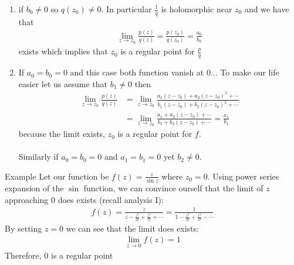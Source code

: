 \begin{enumerate}
    \item if $b_0 \neq 0$ so $q\left(z_0\right) \neq 0$. In particular $\frac{1}{q}$ is holomorphic near $z_0$ and we have that
		\begin{align*} \lim_{z  \to z_0} \frac{p\left(z\right)}{q\left(z\right)} = \frac{p\left(z_0\right)}{q\left(z_0\right)}= \frac{a_0}{b_0} \end{align*}
		exists which implies that $z_0$ is a regular point for $\frac{p}{q}$
	\item If $a_0 = b_0 = 0$ and this case both function vanish at 0... To make our life easier let us assume that $b_1 \neq 0$ then 
		\begin{align*} \lim_{z \to z_0} \frac{p\left(z\right)}{q\left(z\right)} &= \lim_{z  \to z_0}  \frac{a_1\left(z - z_0\right) + a_2 \left(z - z_0\right)^2 + \cdots}{b_1\left(z - z_0\right) + b_2\left(z - z_0\right)^2 + \cdots} \\
&= \lim_{z  \to z_0} \frac{a_1 + a_2\left(z - z_0\right) + \cdots}{b_1 + b_2\left(z - z_0\right) + \cdots} =  \frac{a_1}{b_1}
		\end{align*}
		because the limit exists, $z_0$ is a regular point for $f$. \\ $ $\\ Similarly if $a_0 = b_0 = 0$ and $a_1 = b_1 = 0$ yet $b_2 \neq 0$.
\end{enumerate}
\begin{parag}{Example}
    Let our function be $f\left(z\right) = \frac{z}{\sin z}$ where $z_0 = 0$. Using power series expansion of the $\sin$ function, we can convince ourself that the limit of $z$ approaching $0$ does exists (recall analysis I):
	\begin{align*} 
		f\left(z\right) = \frac{z}{z - \frac{z^3}{3!} + \frac{z^{5}}{5!} + \cdots} = \frac{1}{1 - \frac{z^2}{3!} + \frac{z^{4}}{5!} - \cdots}
	\end{align*}
	By setting $z = 0$ we can see that the limit does exists:
	\begin{align*} 
		\lim_{z \to 0}  f\left(z\right) = 1
	\end{align*}
	Therefore, $0$ is a regular point
\end{parag}



